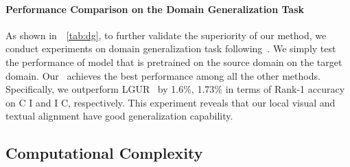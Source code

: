 \paragraph{Performance Comparison on the Domain Generalization Task}
As shown in~\tablename~\ref{tab:dg}, to further validate the superiority of our method, we conduct experiments on domain generalization task following~\cite{lgur}. We simply test the performance of model that is pretrained on the source domain on the target domain. Our \ourmodel~achieves the best performance among all the other methods. Specifically, we outperform LGUR~\cite{lgur} by 1.6\%, 1.73\% in terms of Rank-1 accuracy on C  I and I  C, respectively.
This experiment reveals that our local visual and textual alignment have good generalization capability.


\begin{table}[t!]
\renewcommand\arraystretch{1.06}
\centering
\caption{\small{Computational cost comparison among state-of-the-art methods on the CUHK-PEDES database. ``CAM'' represents the cross-modal attention mechanism.}}
\label{tab:costtime}
\end{table}


\subsection{Computational Complexity}

